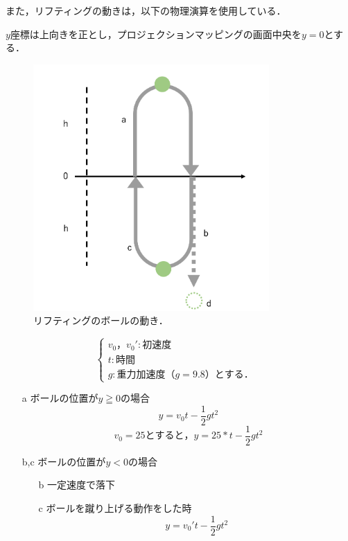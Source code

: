 \vspace{1cm}

また，リフティングの動きは，以下の物理演算を使用している．

$y$座標は上向きを正とし，プロジェクションマッピングの画面中央を$y=0$とする．

\clearpage

\begin{figure}[h]
    \centering
    \includegraphics[width=9cm]{image/butsuri2.png}
    \caption[リフティングのボールの動き]{リフティングのボールの動き．}
  \label{butsuri}
\end{figure}



\[
    \begin{cases}
        v_0，v_0': 初速度 & \\
        t: 時間 & \\
        g: 重力加速度（g=9.8）とする． &
    \end{cases}
\]

\vspace{1cm}

\begin{itemize}
    \item[a] ボールの位置が$y \geqq 0$の場合
        \begin{equation}
            y=v_0t-\frac{1}{2}gt^2
        \end{equation}
        \begin{equation}
            v_0=25とすると，y=25*t-\frac{1}{2}gt^2
        \end{equation}
    \item[b,c] ボールの位置が$y < 0$の場合
        \begin{itemize}
            \item[b] 一定速度で落下
            \item[c] ボールを蹴り上げる動作をした時
                \begin{equation}
                    y=v_0't-\frac{1}{2}gt^2
                \end{equation}
        \end{itemize}
\end{itemize}

